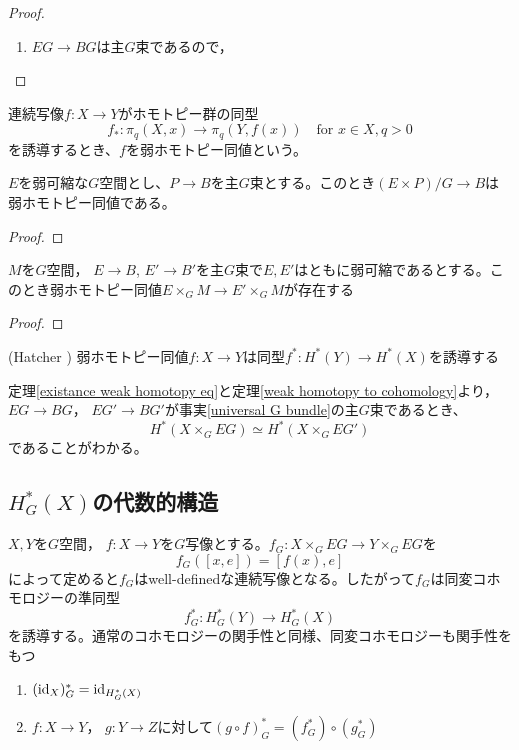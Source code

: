 \begin{proof}
  \begin{enumerate}
    \item $EG\rightarrow BG$は主$G$束であるので，
  \end{enumerate}
\end{proof}

連続写像$f\colon X\rightarrow Y$がホモトピー群の同型
\[
f_*\colon\pi_q(X, x)\rightarrow \pi_q(Y, f(x))\quad\text{for } x\in X, q>0 
\]
を誘導するとき、$f$を弱ホモトピー同値という。

\begin{lemm}
  $E$を弱可縮な$G$空間とし、$P\rightarrow B$を主$G$束とする。このとき$(E\times P)/G\rightarrow B$は弱ホモトピー同値である。
\end{lemm}

\begin{proof}
  
\end{proof}

\begin{theo}\label{existance weak homotopy eq}
  $M$を$G$空間， $E\rightarrow B$, $E'\rightarrow B'$を主$G$束で$E,E'$はともに弱可縮であるとする。このとき弱ホモトピー同値$E\times_GM\rightarrow E'\times_GM$が存在する
\end{theo}

\begin{proof}
  
\end{proof}

\begin{theo}(Hatcher \cite{hatcher})\label{weak homotopy to cohomology}
  弱ホモトピー同値$f\colon X\rightarrow Y$は同型$f^*\colon H^*(Y)\rightarrow H^*(X)$を誘導する
\end{theo}

定理\ref{existance weak homotopy eq}と定理\ref{weak homotopy to cohomology}より， $EG\rightarrow BG$， $EG'\rightarrow BG'$が事実\ref{universal G bundle}の主$G$束であるとき、
\[
H^*(X\times_GEG)\simeq H^*(X\times_GEG')
\]
であることがわかる。

\subsection{$H^*_G(X)$の代数的構造}

$X, Y$を$G$空間， $f\colon X\rightarrow Y$を$G$写像とする。$f_G\colon X\times_GEG\rightarrow Y\times_GEG$を
\[
f_G([x, e])=[f(x), e]
\]
によって定めると$f_G$はwell-definedな連続写像となる。したがって$f_G$は同変コホモロジーの準同型
\[
f_G^*\colon H^*_G(Y)\rightarrow H^*_G(X)
\]
を誘導する。通常のコホモロジーの関手性と同様、同変コホモロジーも関手性をもつ
\begin{prop}\:
  \begin{enumerate}
    \item $(\text{id}_{X})_G^*=\text{id}_{H^*_G(X)}$
    \item $f\colon X\rightarrow Y$， $g\colon Y\rightarrow Z$に対して$(g\circ f)_G^*=(f_G^*)\circ(g_G^*)$
  \end{enumerate}
\end{prop}

